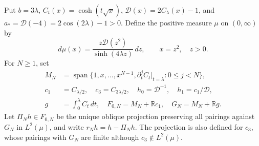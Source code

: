 Put $b=3\lambda$, $C_t(x)=\cosh(t\sqrt x)$,
$\mathcal D(x)=2C_\lambda(x)-1$, and
$a_*=\mathcal D(-4)=2\cos(2\lambda)-1>0$.
Define the positive measure $\mu$ on $(0,\infty)$ by
\begin{equation}\label{c:strip-measure}
 d\mu(x)=\frac{z\mathcal D(z^2)}{\sinh(4\lambda z)}\,dz,
 \qquad x=z^2,\quad z>0.
\end{equation}
For $N\ge1$, set
\[
 \begin{split}
 M_N&=\operatorname{span}\{1,x,\ldots,x^{N-1},
              \partial_t^j C_t|_{t=\lambda}:0\le j<N\},\\
 c_1&=C_{\lambda/2},\quad c_3=C_{3\lambda/2},\quad
 h_0=\mathcal D^{-1},\quad h_1=c_1/\mathcal D,\\
 g&=\int_0^\lambda C_t\,dt,
 \quad F_{0,N}=M_N+\mathbb R c_1,
 \quad G_N=M_N+\mathbb R g.
 \end{split}
\]
Let $\Pi_Nh\in F_{0,N}$ be the unique oblique projection preserving
all pairings against $G_N$ in $L^2(\mu)$, and write
$r_Nh=h-\Pi_Nh$.  The projection is also defined for $c_3$, whose
pairings with $G_N$ are finite although $c_3\notin L^2(\mu)$.

